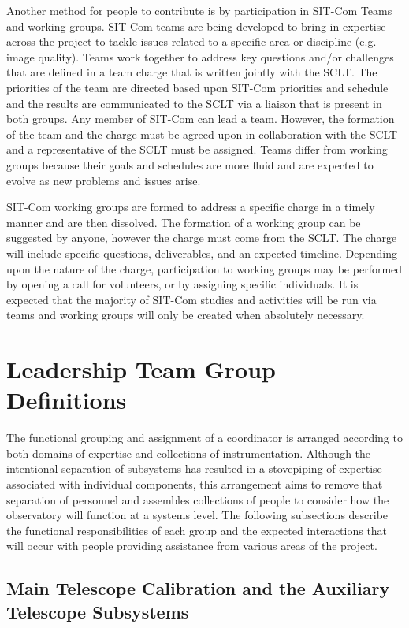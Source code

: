 \documentclass[SE,toc]{lsstdoc}
\begin{document}
Another method for people to contribute is by participation in SIT-Com Teams and working groups.
SIT-Com teams are being developed to bring in expertise across the project to tackle issues related to a specific area or discipline (e.g. image quality).
Teams work together to address key questions and/or challenges that are defined in a team charge that is written jointly with the SCLT.
The priorities of the team are directed based upon SIT-Com priorities and schedule and the results are communicated to the SCLT via a liaison that is present in both groups.
Any member of SIT-Com can lead a team.
However, the formation of the team and the charge must be agreed upon in collaboration with the SCLT and a representative of the SCLT must be assigned.
Teams differ from working groups because their goals and schedules are more fluid and are expected to evolve as new problems and issues arise.

SIT-Com working groups are formed to address a specific charge in a timely manner and are then dissolved.
The formation of a working group can be suggested by anyone, however the charge must come from the SCLT.
The charge will include specific questions, deliverables, and an expected timeline.
Depending upon the nature of the charge, participation to working groups may be performed by opening a call for volunteers, or by assigning specific individuals.
It is expected that the majority of SIT-Com studies and activities will be run via teams and working groups will only be created when absolutely necessary.

\section{Leadership Team Group Definitions}
\label{sec:group_definitions}

The functional grouping and assignment of a coordinator is arranged according to both domains of expertise and collections of instrumentation.
Although the intentional separation of subsystems has resulted in a stovepiping of expertise associated with individual components, this arrangement aims to remove that separation of personnel and assembles collections of people to consider how the observatory will function at a systems level.
The following subsections describe the functional responsibilities of each group and the expected interactions that will occur with people providing assistance from various areas of the project.

\subsection{Main Telescope Calibration and the Auxiliary Telescope Subsystems}
\end{document}
